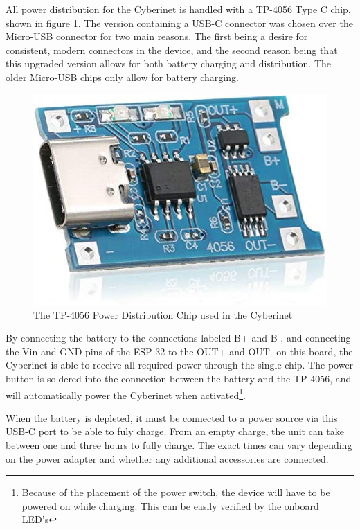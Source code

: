 All power distribution for the Cyberinet is handled with a TP-4056 Type C chip, shown in figure \ref{fig:tp5046}. The version containing a USB-C connector was chosen over the Micro-USB connector for two main reasons. The first being a desire for consistent, modern connectors in the device, and the second reason being that this upgraded version allows for both battery charging and distribution. The older Micro-USB chips only allow for battery charging.


\begin{center}
    \begin{figure}
        \centering
        \includegraphics[scale=0.5]{diagrams/oem/4056.jpg}
        \caption{The TP-4056 Power Distribution Chip used in the Cyberinet}
        \label{fig:tp5046}
    \end{figure}
\end{center}

By connecting the battery to the connections labeled B+ and B-, and connecting the Vin and GND pins of the ESP-32 to the OUT+ and OUT- on this board, the Cyberinet is able to receive all required power through the single chip. The power button is soldered into the connection between the battery and the TP-4056, and will automatically power the Cyberinet when activated\footnote{Because of the placement of the power switch, the device will have to be powered on while charging. This can be easily verified by the onboard LED's}. 

When the battery is depleted, it must be connected to a power source via this USB-C port to be able to fuly charge. From an empty charge, the unit can take between one and three hours to fully charge. The exact times can vary depending on the power adapter and whether any additional accessories are connected. 

